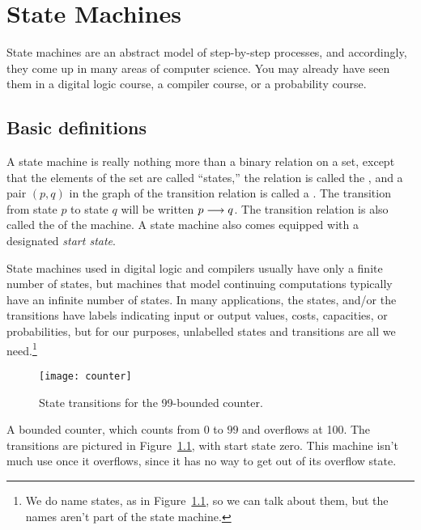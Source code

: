\chapter{State Machines}\label{chap:state-machines}


State machines are an abstract model of step-by-step processes, and
accordingly, they come up in many areas of computer science.  You may
already have seen them in a digital logic course, a compiler course, or a
probability course.

\section{Basic definitions}

A state machine is really nothing more than a binary relation on a
set, except that the elements of the set are called ``states,'' the
relation is called the , and a pair $(p,q)$
in the graph of the transition relation is called a .
The transition from state $p$ to state $q$ will be written $p \mathrel{\longrightarrow}
q$.  The transition relation is also called the  of
the machine.  A state machine also comes equipped with a designated
\emph{start state}.

State machines used in digital logic and compilers usually have only a
finite number of states, but machines that model continuing computations
typically have an infinite number of states.  In many applications, the
states, and/or the transitions have labels indicating input or output
values, costs, capacities, or probabilities, but for our purposes,
unlabelled states and transitions are all we need.\footnote{We do name
states, as in Figure~\ref{fig:counter}, so we can talk about them, but the
names aren't part of the state machine.}

\begin{figure}[htbp]
\centering \texttt{[image: counter]}
\caption{State transitions for the 99-bounded counter.}
\label{fig:counter}
\end{figure}

\begin{example}
A bounded counter, which counts from $0$ to $99$ and overflows at 100.
The transitions are pictured in Figure~\ref{fig:counter}, with start
state zero.  This machine isn't much use once it overflows, since it
has no way to get out of its overflow state.

\end{example}

